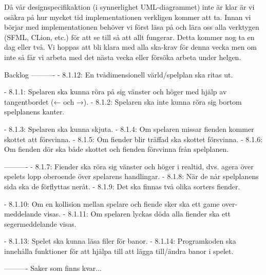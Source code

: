 Då vår designspecifikaktion (i synnerlighet UML-diagrammet) inte är klar är vi osäkra på hur mycket tid implementationen verkligen kommer att ta. Innan vi börjar med implementationen behöver vi först läsa på och lära oss alla verktygen (SFML, CLion, etc.) för att se till så att allt fungerar. Detta kommer nog ta en dag eller två. Vi hoppas att bli klara med alla ska-krav för denna vecka men om inte så får vi arbeta med det nästa vecka eller försöka arbeta under helgen.

Backlog
----------
- 8.1.12: En tvådimensionell värld/spelplan ska ritas ut.

- 8.1.1: Spelaren ska kunna röra på sig vänster och höger med hjälp av tangentbordet (← och →).
- 8.1.2: Spelaren ska inte kunna röra sig bortom spelplanens kanter.

- 8.1.3: Spelaren ska kunna skjuta.
- 8.1.4: Om spelaren missar fienden kommer skottet att försvinna.
- 8.1.5: Om fiender blir träffad ska skottet försvinna.
- 8.1.6: Om fienden dör ska både skottet och fienden försvinna från spelplanen.

----------
- 8.1.7: Fiender ska röra sig vänster och höger i realtid, dvs. agera över spelets lopp oberoende över spelarens handlingar.
- 8.1.8: När de når spelplanens sida ska de förflyttas neråt.
- 8.1.9: Det ska finnas två olika sorters fiender.

- 8.1.10: Om en kollision mellan spelare och fiende sker ska ett game over-meddelande visas.
- 8.1.11: Om spelaren lyckas döda alla fiender ska ett segermeddelande visas.

- 8.1.13: Spelet ska kunna läsa filer för banor.
- 8.1.14: Programkoden ska innehålla funktioner för att hjälpa till att lägga till/ändra banor i spelet.

----------
Saker som finns kvar...